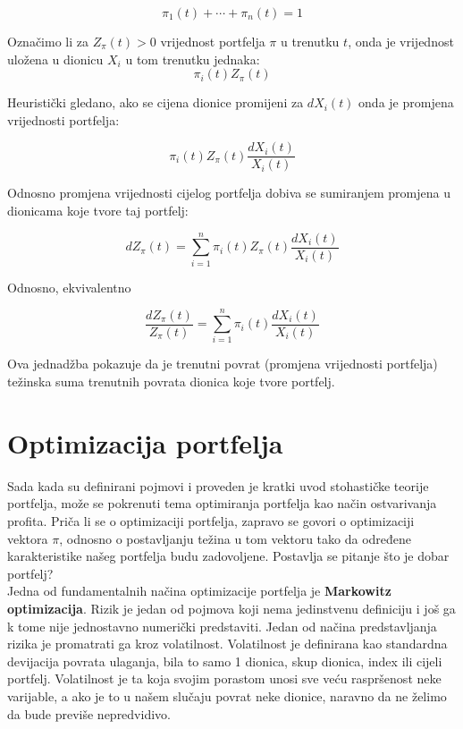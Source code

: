 \documentclass[times, utf8, seminar]{fer}
\begin{document}
    \[ \pi_1(t) + \cdots + \pi_n(t) = 1 \]

Označimo li za $Z_{\pi}(t) > 0$ vrijednost portfelja $\pi$ u trenutku $t$, onda je vrijednost uložena u dionicu $X_i$ u tom trenutku jednaka:
    \[ \pi_i(t)Z_{\pi}(t) \]

Heuristički gledano, ako se cijena dionice promijeni za $dX_i(t)$ onda je promjena vrijednosti portfelja:

    \[ \pi_i(t)Z_{\pi}(t)\frac{dX_i(t)}{X_i(t)} \]

Odnosno promjena vrijednosti cijelog portfelja dobiva se sumiranjem promjena u dionicama koje tvore taj portfelj:

    \[ dZ_{\pi}(t) = \sum_{i=1}^{n} \pi_i(t)Z_{\pi}(t)\frac{dX_i(t)}{X_i(t)} \]

Odnosno, ekvivalentno

    \[ \frac{dZ_{\pi}(t)}{Z_{\pi}(t)} = \sum_{i=1}^{n} \pi_i(t)\frac{dX_i(t)}{X_i(t)} \]

Ova jednadžba pokazuje da je trenutni povrat (promjena vrijednosti portfelja) težinska suma trenutnih povrata dionica koje tvore portfelj.

\section{Optimizacija portfelja}
Sada kada su definirani pojmovi i proveden je kratki uvod stohastičke teorije portfelja, može se pokrenuti tema optimiranja portfelja kao način ostvarivanja profita. Priča li se o optimizaciji portfelja, zapravo se govori o optimizaciji vektora $\pi$, odnosno o postavljanju težina u tom vektoru tako da određene karakteristike našeg portfelja budu zadovoljene. Postavlja se pitanje što je dobar portfelj? \\

Jedna od fundamentalnih načina optimizacije portfelja je \textbf{Markowitz optimizacija}. Rizik je jedan od pojmova koji nema jedinstvenu definiciju i još ga k tome nije jednostavno numerički predstaviti. Jedan od načina predstavljanja rizika je promatrati ga kroz volatilnost. Volatilnost je definirana kao standardna devijacija povrata ulaganja, bila to samo 1 dionica, skup dionica, index ili cijeli portfelj. Volatilnost je ta koja svojim porastom unosi sve veću raspršenost neke varijable, a ako je to u našem slučaju povrat neke dionice, naravno da ne želimo da bude previše nepredvidivo.
\end{document}
